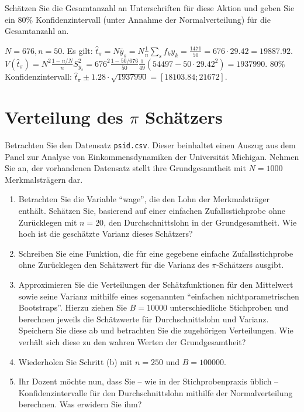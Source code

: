 \documentclass{article}
\begin{document}
Schätzen Sie die Gesamtanzahl an Unterschriften für diese Aktion und geben Sie ein 80\% Konfidenzintervall (unter Annahme der Normalverteilung) für die Gesamtanzahl an.
\begin{solution}
	$N=676, n=50$. Es gilt: $\hat{t}_\pi = N \bar{y}_s = N\frac{1}{n} \sum_s f_k y_k = \frac{1471}{50} = 676 \cdot 29.42 = 19887.92$.
	$V(\hat{t}_\pi) = N^2 \frac{1-n/N}{n} S_{y_s}^2= 676^2 \frac{1-50/676}{50} \frac{1}{49}(54497-50 \cdot 29.42^2) = 1937990$. 80\% Konfidenzintervall: $\hat{t}_\pi \pm 1.28 \cdot \sqrt{1937990} = [18103.84;21672]$.
\end{solution}

\section{Verteilung des $\pi$ Schätzers}\label{ex:Verteilung}
Betrachten Sie den Datensatz \texttt{psid.csv}. Dieser beinhaltet einen Auszug aus dem Panel zur Analyse von Einkommensdynamiken der Universität Michigan. Nehmen Sie an, der vorhandenen Datensatz stellt ihre Grundgesamtheit mit $N=1000$ Merkmalsträgern dar. 

\begin{enumerate}
	\item Betrachten Sie die Variable \enquote{wage}, die den Lohn der Merkmalsträger enthält. Schätzen Sie, basierend auf einer einfachen Zufallsstichprobe ohne Zurücklegen mit $n=20$, den Durchschnittslohn in der Grundgesamtheit. Wie hoch ist die geschätzte Varianz dieses Schätzers?
	\item Schreiben Sie eine Funktion, die für eine gegebene einfache Zufallsstichprobe ohne Zurücklegen den Schätzwert für die Varianz des $\pi$-Schätzers ausgibt.
	\item Approximieren Sie die Verteilungen der Schätzfunktionen für den Mittelwert sowie seine Varianz mithilfe eines sogenannten \enquote{einfachen nichtparametrischen Bootstraps}. Hierzu ziehen Sie $B=10000$ unterschiedliche Stichproben und berechnen jeweils die Schätzwerte für Durchschnittslohn und Varianz. Speichern Sie diese ab und betrachten Sie die zugehörigen Verteilungen. Wie verhält sich diese zu den wahren Werten der Grundgesamtheit?
	\item Wiederholen Sie Schritt (b) mit $n=250$ und $B=100000$.
	\item Ihr Dozent möchte nun, dass Sie -- wie in der Stichprobenpraxis üblich -- Konfidenzintervalle für den Durchschnittslohn mithilfe der Normalverteilung berechnen. Was erwidern Sie ihm?
\end{enumerate} 
\end{document}
